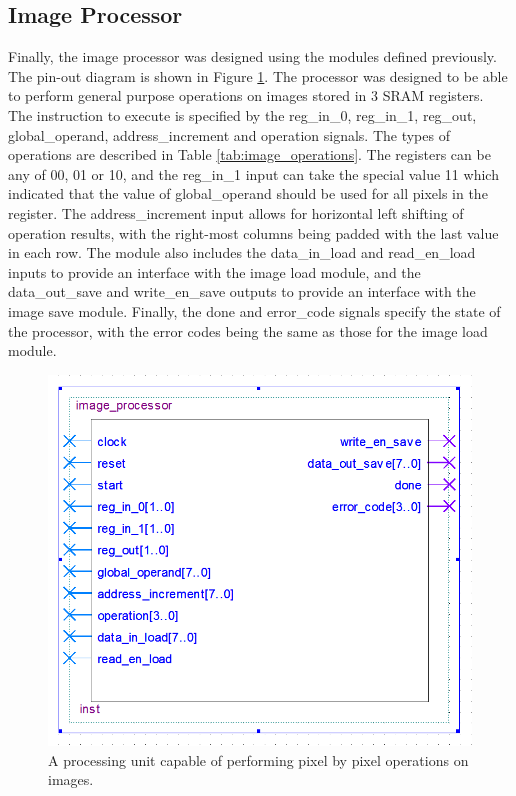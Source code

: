 \documentclass[a4paper, 10pt, titlepage]{article}
\begin{document}
\subsection{Image Processor}

Finally, the image processor was designed using the modules defined previously. The pin-out diagram is shown in Figure \ref{fig:image_processor}. The processor was designed to be able to perform general purpose operations on images stored in 3 SRAM registers. The instruction to execute is specified by the reg\_in\_0, reg\_in\_1, reg\_out, global\_operand, address\_increment and operation signals. The types of operations are described in Table \ref{tab:image_operations}. The registers can be any of 00, 01 or 10, and the reg\_in\_1 input can take the special value 11 which indicated that the value of global\_operand should be used for all pixels in the register. The address\_increment input allows for horizontal left shifting of operation results, with the right-most columns being padded with the last value in each row. The module also includes the data\_in\_load and read\_en\_load inputs to provide an interface with the image load module, and the data\_out\_save and write\_en\_save outputs to provide an interface with the image save module. Finally, the done and error\_code signals specify the state of the processor, with the error codes being the same as those for the image load module.

\begin{figure}
    \centering
    \includegraphics[width=0.5\linewidth]{image_processor_entity.PNG}
    \caption{A processing unit capable of performing pixel by pixel operations on images.}
    \label{fig:image_processor}
\end{figure}
\end{document}
